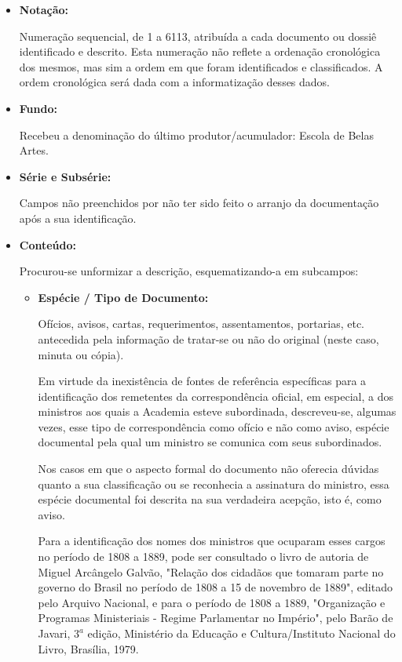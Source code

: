 \begin{itemize}
	\item \textbf{Notação:}
	
	Numeração sequencial, de 1 a 6113, atribuída a cada documento ou dossiê identificado e descrito. Esta numeração não reflete a ordenação cronológica dos mesmos, mas sim a ordem em que foram identificados e classificados. A ordem cronológica será dada com a informatização desses dados.
	
	\item \textbf{Fundo:}
	
	Recebeu a denominação do último produtor/acumulador: Escola de Belas Artes.
	
	\item \textbf{Série e Subsérie:}
	
	Campos não preenchidos por não ter sido feito o arranjo da documentação após a sua identificação.
	
	\item \textbf{Conteúdo:}
	
	Procurou-se unformizar a descrição, esquematizando-a em subcampos:
	
	\begin{itemize}
		\item \textbf{Espécie / Tipo de Documento:}
		
		Ofícios, avisos, cartas, requerimentos, assentamentos, portarias, etc. antecedida pela informação de tratar-se ou não do original (neste caso, minuta ou cópia).
		
		Em virtude da inexistência de fontes de referência específicas para a identificação dos remetentes da correspondência oficial, em especial, a dos ministros aos quais a Academia esteve subordinada, descreveu-se, algumas vezes, esse tipo de correspondência como ofício e não como aviso, espécie documental pela qual um ministro se comunica com seus subordinados.
		
		Nos casos em que o aspecto formal do documento não oferecia dúvidas quanto a sua classificação ou se reconhecia a assinatura do ministro, essa espécie documental foi descrita na sua verdadeira acepção, isto é, como aviso.
		
		Para a identificação dos nomes dos ministros que ocuparam esses cargos no período de 1808 a 1889, pode ser consultado o livro de autoria de Miguel Arcângelo Galvão, "Relação dos cidadãos que tomaram parte no governo do Brasil no período de 1808 a 15 de novembro de 1889", editado pelo Arquivo Nacional, e para o período de 1808 a 1889, "Organização e Programas Ministeriais - Regime Parlamentar no Império", pelo Barão de Javari, $3^a$ edição, Ministério da Educação e Cultura/Instituto Nacional do Livro, Brasília, 1979.
		

\end{itemize}
\end{itemize}
